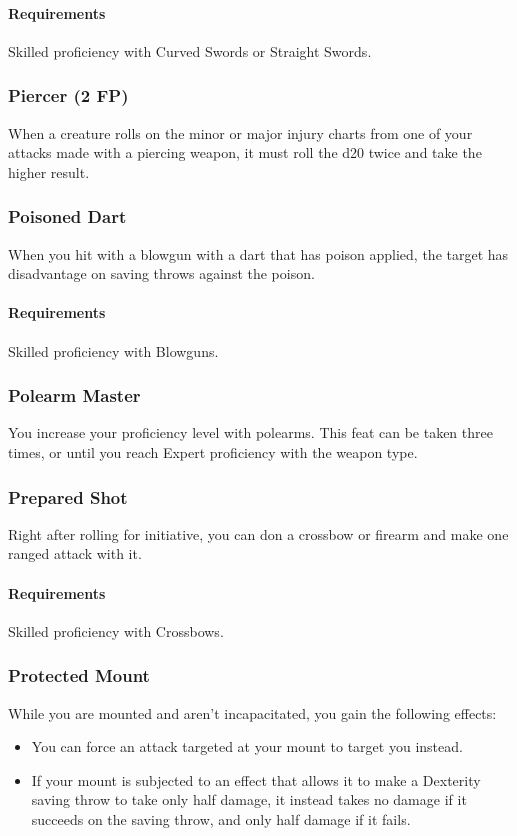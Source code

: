     \paragraph{Requirements} Skilled proficiency with Curved Swords or Straight Swords.
\subsubsection{Piercer (2 FP)} \label{feat::piercer}
    When a creature rolls on the minor or major injury charts from one of your attacks made with a piercing weapon, it must roll the d20 twice and take the higher result.
\subsubsection{Poisoned Dart} \label{feat::poisoneddart}
    When you hit with a blowgun with a dart that has poison applied, the target has disadvantage on saving throws against the poison.
    \paragraph{Requirements} Skilled proficiency with Blowguns.
\subsubsection{Polearm Master} \label{feat::polearmmaster}
    You increase your proficiency level with polearms.
    This feat can be taken three times, or until you reach Expert proficiency with the weapon type.
\subsubsection{Prepared Shot} \label{feat::preparedshot}
    Right after rolling for initiative, you can don a crossbow or firearm and make one ranged attack with it.
    \paragraph{Requirements} Skilled proficiency with Crossbows.
\subsubsection{Protected Mount} \label{feat::protectedmount}
    While you are mounted and aren't incapacitated, you gain the following effects:
    \begin{itemize}
        \item You can force an attack targeted at your mount to target you instead.
        \item If your mount is subjected to an effect that allows it to make a Dexterity saving throw to take only half damage, it instead takes no damage if it succeeds on the saving throw, and only half damage if it fails.
    \end{itemize}
